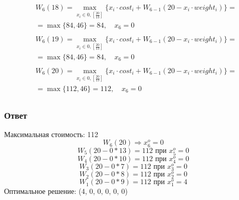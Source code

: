 \documentclass[17pt]{extarticle}
\begin{document}
\[
    \begin{aligned}
         & W_6(18)=\max_{x_i \in \overline{0, \left[\frac{20}{13}\right]}} \{x_i \cdot cost_i + W_{6-1}(20 - x_i \cdot weight_i)\}= \\& = \max \{
        84, 46\}= 84, \quad x_6 = 0                                                                                                 \\
    \end{aligned}
\]
\[
    \begin{aligned}
         & W_6(19)=\max_{x_i \in \overline{0, \left[\frac{20}{13}\right]}} \{x_i \cdot cost_i + W_{6-1}(20 - x_i \cdot weight_i)\}= \\& = \max \{
        84, 46\}= 84, \quad x_6 = 0                                                                                                 \\
    \end{aligned}
\]
\[
    \begin{aligned}
         & W_6(20)=\max_{x_i \in \overline{0, \left[\frac{20}{13}\right]}} \{x_i \cdot cost_i + W_{6-1}(20 - x_i \cdot weight_i)\}= \\& = \max \{
        112, 46\}= 112, \quad x_6 = 0                                                                                               \\
    \end{aligned}
\]
\subsubsection*{Ответ}
Максимальная стоимость: 112
\[W_6(20) \Rightarrow x_6^o=0\]
\[W_5(20 - 0 * 13)=112\text{ при }x_5^o=0\]
\[W_4(20 - 0 * 10)=112\text{ при }x_4^o=0\]
\[W_3(20 - 0 * 7)=112\text{ при }x_3^o=0\]
\[W_2(20 - 0 * 8)=112\text{ при }x_2^o=0\]
\[W_1(20 - 0 * 9)=112\text{ при }x_1^o=4\]
Оптимальное решение: (4, 0, 0, 0, 0, 0)
\end{document}
